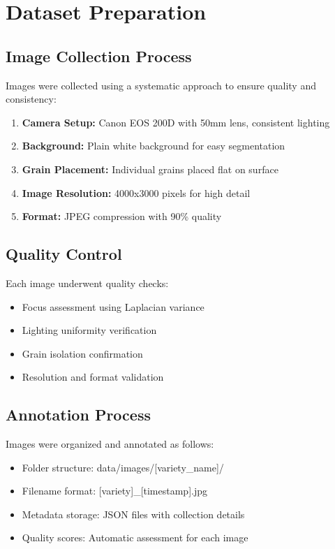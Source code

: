 \documentclass[conference]{IEEEtran}
\begin{document}
\appendix


\section{Dataset Preparation}

\subsection{Image Collection Process}

Images were collected using a systematic approach to ensure quality and consistency:

\begin{enumerate}
    \item \textbf{Camera Setup:} Canon EOS 200D with 50mm lens, consistent lighting
    \item \textbf{Background:} Plain white background for easy segmentation
    \item \textbf{Grain Placement:} Individual grains placed flat on surface
    \item \textbf{Image Resolution:} 4000x3000 pixels for high detail
    \item \textbf{Format:} JPEG compression with 90\% quality
\end{enumerate}

\subsection{Quality Control}

Each image underwent quality checks:
\begin{itemize}
    \item Focus assessment using Laplacian variance
    \item Lighting uniformity verification
    \item Grain isolation confirmation
    \item Resolution and format validation
\end{itemize}

\subsection{Annotation Process}

Images were organized and annotated as follows:
\begin{itemize}
    \item Folder structure: data/images/[variety\_name]/
    \item Filename format: [variety]\_[timestamp].jpg
    \item Metadata storage: JSON files with collection details
    \item Quality scores: Automatic assessment for each image
\end{itemize}
\end{document}
